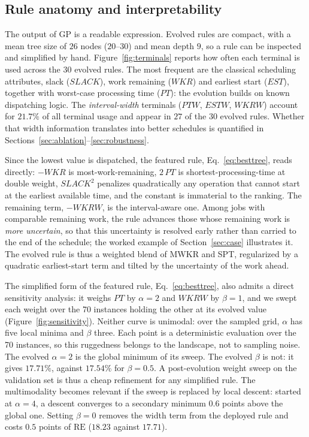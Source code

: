 \documentclass[preprint,number,sort&compress,12pt]{elsarticle}
\newcommand{\RE}{\mathrm{RE}}
\begin{document}
\subsection{Rule anatomy and interpretability}
\label{sec:anatomy}
The output of GP is a readable expression. Evolved rules are compact,
with a mean tree size of $26$ nodes ($20$--$30$) and mean depth $9$, so
a rule can be inspected and simplified by hand.
Figure~\ref{fig:terminals} reports how often each terminal is used
across the 30 evolved rules. The most frequent are the classical
scheduling attributes, slack ($\mathit{SLACK}$), work remaining
($\mathit{WKR}$) and earliest start ($\mathit{EST}$), together with
worst-case processing time ($\mathit{PT}$): the evolution builds on
known dispatching logic. The \emph{interval-width} terminals ($\mathit{PTW}$,
$\mathit{ESTW}$, $\mathit{WKRW}$) account for $21.7\%$ of all
terminal usage and appear in $27$ of the $30$ evolved rules. Whether
that width information translates into better schedules is quantified in
Sections~\ref{sec:ablation}--\ref{sec:robustness}.

Since the lowest value is dispatched, the featured rule,
Eq.~\eqref{eq:besttree}, reads directly: $-\mathit{WKR}$ is most-work-remaining, $2\,
\mathit{PT}$ is shortest-processing-time at double weight, $\mathit{
SLACK}^{2}$ penalizes quadratically any operation that cannot start at
the earliest available time, and the constant is immaterial to the
ranking. The remaining term, $-\mathit{WKRW}$, is the interval-aware
one. Among jobs with comparable remaining work, the rule advances those
whose remaining work is \emph{more uncertain}, so that this uncertainty
is resolved early rather than carried to the end of the schedule; the
worked example of Section~\ref{sec:case} illustrates it.
The evolved rule is thus a weighted blend of MWKR and SPT, regularized
by a quadratic earliest-start term and tilted by the uncertainty of the
work ahead.

The simplified form of the featured rule, Eq.~\eqref{eq:besttree}, also
admits a direct sensitivity analysis: it weighs $\mathit{PT}$ by
$\alpha = 2$ and $\mathit{WKRW}$ by $\beta = 1$, and we swept each
weight over the 70 instances holding the other at its evolved value
(Figure~\ref{fig:sensitivity}). Neither curve is unimodal: over the
sampled grid, $\alpha$ has five local minima and $\beta$ three. Each
point is a deterministic evaluation over the 70 instances, so this
ruggedness belongs to the landscape, not to sampling noise. The evolved
$\alpha = 2$ is the global minimum of its sweep. The evolved $\beta$ is
not: it gives $17.71\%$, against $17.54\%$ for $\beta = 0.5$. A post-evolution weight sweep on the validation set is thus a cheap
refinement for any simplified rule. The multimodality becomes relevant if the sweep is replaced by local descent: started at $\alpha = 4$, a descent converges to a secondary minimum $0.6$ points above the global one. Setting
$\beta = 0$ removes the width term from the deployed rule and costs
$0.5$ points of $\RE$ ($18.23$ against $17.71$).
\end{document}
